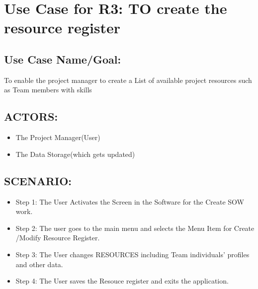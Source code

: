 \documentclass[10pt]{article}
\begin{document}
\section{Use Case for R3: TO create the resource register  }



\subsection{Use Case Name/Goal: }

To enable the project manager to create a List of available project resources such as Team members with skills



\subsection{ACTORS:}

\begin{itemize}

  \item   The Project Manager(User)

  \item  The Data Storage(which gets updated)



\end{itemize}

						



\subsection{SCENARIO: }



\begin{itemize}

  \item Step 1: The User Activates the Screen in the Software for the Create SOW work.

  \item Step 2: The user goes to the main menu and selects the Menu Item for Create /Modify Resource Register.

\item  Step 3: The User changes RESOURCES including Team individuals' profiles and other data.

\item Step 4:  The User saves the Resouce register and exits the application.

\end{itemize}
\end{document}
